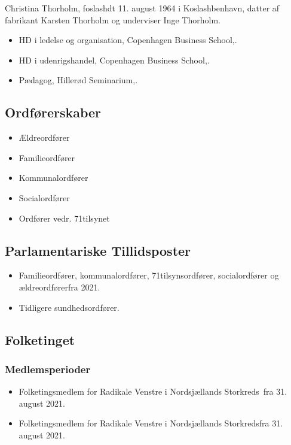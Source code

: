 \documentclass[11pt, a4paper]{awesome-cv}
\begin{document}
\makecvheader[R]
\makelettertitle
\begin{cvletter}
Christina Thorholm, foslashdt 11. august 1964 i Koslashbenhavn, datter af fabrikant Karsten Thorholm og underviser Inge Thorholm.

\begin{itemize}
\item HD i ledelse og organisation, Copenhagen Business School,.
\item HD i udenrigshandel, Copenhagen Business School,.
\item Pædagog, Hillerød Seminarium,.
\end{itemize}
\subsection*{Ordførerskaber}
\begin{itemize}
\item Ældreordfører
\item Familieordfører
\item Kommunalordfører
\item Socialordfører
\item Ordfører vedr.  71tilsynet 
\end{itemize}
\subsection*{Parlamentariske Tillidsposter}
\begin{itemize}
\item Familieordfører, kommunalordfører,  71tilsynsordfører, socialordfører og ældreordførerfra 2021.
\item Tidligere sundhedsordfører.
\end{itemize}
\subsection*{Folketinget}
\subsubsection*{Medlemsperioder}
\begin{itemize}
\item Folketingsmedlem for Radikale Venstre i Nordsjællands Storkreds fra 31. august 2021.
\item Folketingsmedlem for Radikale Venstre i Nordsjællands Storkredsfra 31. august 2021.
\end{itemize}

\end{cvletter}
\end{document}
